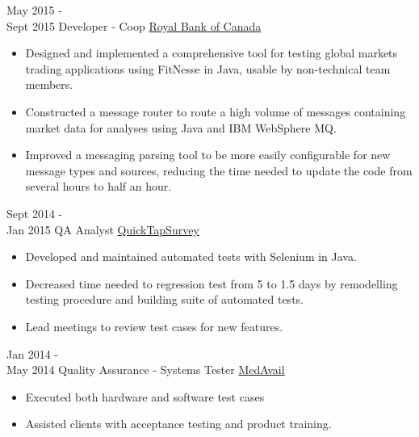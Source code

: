 \documentclass[letterpaper]{twentysecondcv} %
\begin{document}
\begin{twenty}
     \twentyitem
   		{May 2015 - \\ Sept 2015}
        {Developer - Coop}
        {\href{https://www.rbcwealthmanagement.com}{Royal Bank of Canada}}
        {}
        {
        \begin{itemize}
        \item Designed and implemented a comprehensive tool for testing global markets trading applications using FitNesse in Java, usable by non-technical team members.
        \item Constructed a message router to route a high volume of messages containing market data for analyses using Java and IBM WebSphere MQ.
        \item Improved a messaging parsing tool to be more easily configurable for new message types and sources, reducing the time needed to update the code from several hours to half an hour. 
    \end{itemize}
    	}
    	
    \twentyitem
   		{Sept 2014 - \\ Jan 2015}
        {QA Analyst}
        {\href{http://www1.quicktapsurvey.com}{QuickTapSurvey}}
        {}
        {
        {\begin{itemize}
        \item Developed and maintained automated tests with Selenium in Java.
        \item Decreased time needed to regression test from 5 to 1.5 days by remodelling testing procedure and building suite of automated tests.
        \item Lead meetings to review test cases for new features.
    \end{itemize}}
        }
        
    \twentyitem
   		{Jan 2014 - \\ May 2014}
        {Quality Assurance - Systems Tester}
        {\href{http://medavail.com}{MedAvail}}
        {}
        {
        {\begin{itemize}
        \item Executed both hardware and software test cases
        \item Assisted clients with acceptance testing and product training.
    \end{itemize}}
        }
        
\end{twenty}

\end{document}
